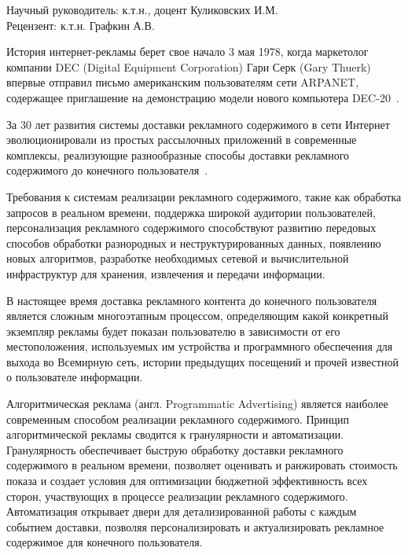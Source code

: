 \documentclass[a4paper, 14pt, oneside]{extarticle}
\begin{document}
    \noindent Научный руководитель: к.т.н., доцент Куликовских И.М.
    \\

    \noindent Рецензент: к.т.н. Графкин А.В.
    \newpage



    История интернет-рекламы берет свое начало 3 мая 1978, когда маркетолог компании DEC (Digital Equipment Corporation) 
    Гари Серк (Gary Thuerk) впервые отправил письмо американским пользователям сети ARPANET, содержащее приглашение
    на демонстрацию модели нового компьютера DEC-20~\autocite{online:spam}.

    За 30 лет развития системы доставки рекламного содержимого в сети Интернет эволюционировали из простых рассылочных
    приложений в современные комплексы, реализующие разнообразные способы доставки рекламного содержимого до 
    конечного пользователя~\autocite{online:google}.

    Требования к системам реализации рекламного содержимого, такие как обработка запросов в реальном времени, 
    поддержка широкой аудитории пользователей, персонализация рекламного содержимого способствуют развитию
    передовых способов обработки разнородных и неструктурированных данных, появлению новых алгоритмов, разработке
    необходимых сетевой и вычислительной инфраструктур для хранения, извлечения и передачи информации.

    В настоящее время доставка рекламного контента до конечного пользователя является сложным многоэтапным процессом, 
    определяющим какой конкретный экземпляр рекламы будет показан пользователю в зависимости от его местоположения,
    используемых им устройства и программного обеспечения для выхода во Всемирную сеть, истории предыдущих
    посещений и прочей известной о пользователе информации.

    Алгоритмическая реклама (англ. Programmatic Advertising) является наиболее современным способом реализации 
    рекламного содержимого. Принцип алгоритмической рекламы сводится к гранулярности и автоматизации. Гранулярность
    обеспечивает быструю обработку доставки рекламного содержимого в реальном времени, позволяет оценивать и ранжировать
    стоимость показа и создает условия для оптимизации бюджетной эффективность всех сторон, участвующих в процессе 
    реализации рекламного содержимого. Автоматизация открывает двери для детализированной работы с каждым событием доставки,
    позволяя персонализировать и актуализировать рекламное содержимое для конечного пользователя.
\end{document}
